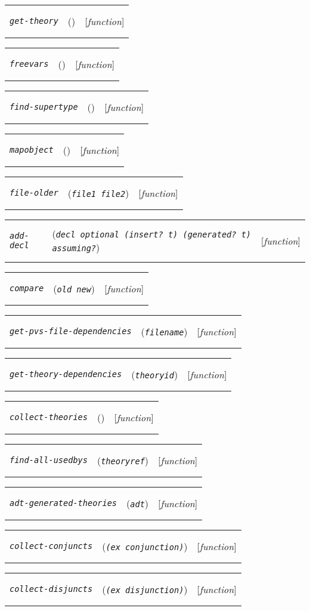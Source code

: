\documentclass[12pt]{book}
\makeatletter
\def\ampoptional{{\smaller\sc {\smaller\smaller \&}optional\ }}
\newenvironment{function}[3]%
{\par\noindent\begin{boxedminipage}{\textwidth}%
 \par\noindent\begin{tabularx}{\linewidth}{l>{\raggedright}Xr}%
 \functionhtgt{#1}&(\texttt{\textit{#2}})&[\emph{#3}]%
 \end{tabularx}\par\flushright\begin{minipage}{.97\textwidth}}
{\end{minipage}\end{boxedminipage}}
\newcommand{\functionnm}[1]{\texttt{\textit{#1}}}
\newcommand{\functionhtgt}[1]{\hypertarget{#1}{\functionnm{#1}}\index{#1@\functionnm{#1}|underline}}
\newenvironment{lispfunction}[2]%
{\begin{function}{#1}{#2}{function}}{\end{function}}
\makeatother
\begin{document}
\begin{lispfunction}{get-theory}{}
\end{lispfunction}

\begin{lispfunction}{freevars}{}
\end{lispfunction}

\begin{lispfunction}{find-supertype}{}
\end{lispfunction}

\begin{lispfunction}{mapobject}{}
\end{lispfunction}

\begin{lispfunction}{file-older}{file1 file2}
\end{lispfunction}

\begin{lispfunction}{add-decl}
  {decl \ampoptional \textup{(}insert? \textup{t}\textup{)} \textup{(}generated? \textup{t}\textup{)} assuming?}
\end{lispfunction}

\begin{lispfunction}{compare}{old new}
\end{lispfunction}

\begin{lispfunction}{get-pvs-file-dependencies}{filename}
\end{lispfunction}

\begin{lispfunction}{get-theory-dependencies}{theoryid}
\end{lispfunction}

\begin{lispfunction}{collect-theories}{}
\end{lispfunction}

\begin{lispfunction}{find-all-usedbys}{theoryref}
\end{lispfunction}

\begin{lispfunction}{adt-generated-theories}{adt}
\end{lispfunction}

\begin{lispfunction}{collect-conjuncts}{(ex conjunction)}
\end{lispfunction}

\begin{lispfunction}{collect-disjuncts}{(ex disjunction)}
\end{lispfunction}
\end{document}
